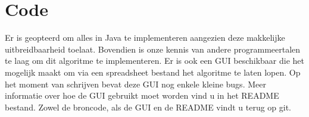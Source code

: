 \documentclass[Main.tex]{subfiles}
\begin{document}
\section{Code}
Er is geopteerd om alles in Java te implementeren aangezien deze makkelijke uitbreidbaarheid toelaat. Bovendien is onze kennis van andere programmeertalen te laag om dit algoritme te implementeren. Er is ook een GUI beschikbaar die het mogelijk maakt om via een spreadsheet bestand het algoritme te laten lopen. Op het moment van schrijven bevat deze GUI nog enkele kleine bugs. Meer informatie over hoe de GUI gebruikt moet worden vind u in het README bestand. Zowel de broncode, als de GUI en de README vindt u terug op git.%
\end{document}
